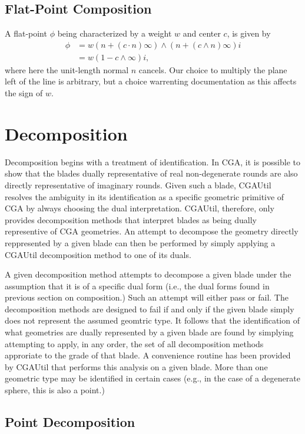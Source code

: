 \documentclass[12pt]{article}
\newcommand{\nvai}{\infty}
\begin{document}
\subsection{Flat-Point Composition}

A flat-point $\phi$ being characterized by a weight $w$ and center $c$, is given
by
\begin{align}\label{equ_flatpoint}
\phi &= w(n+(c\cdot n)\nvai)\wedge(n+(c\wedge n)\nvai)i \\
 &= w(1-c\wedge\nvai)i,
\end{align}
where here the unit-length normal $n$ cancels.  Our choice to multiply the plane
left of the line is arbitrary, but a choice warrenting documentation as this affects the sign of $w$.

\section{Decomposition}

Decomposition begins with a treatment of identification.  In CGA, it is possible
to show that the blades dually representative of real non-degenerate rounds are also
directly representative of imaginary rounds.  Given such a blade, CGAUtil resolves
the ambiguity in its identification as a specific geometric primitive of CGA by always
choosing the dual interpretation.  CGAUtil, therefore, only provides decomposition methods
that interpret blades as being dually representive of CGA geometries.  An attempt
to decompose the geometry directly reppresented by a given blade can then be
performed by simply applying a CGAUtil decomposition method to one of its duals.

A given decomposition method attempts to decompose a given blade
under the assumption that
it is of a specific dual form (i.e., the dual forms found in previous section on composition.)
Such an attempt will either pass or fail.
The decomposition methods are designed to fail if and only if the given blade
simply does not represent the assumed geomtric type.  It follows that the identification of
what geometries are dually represented by a given blade are found by simplying
attempting to apply, in any order, the set of all decomposition methods approriate
to the grade of that blade.  A convenience routine has been provided by CGAUtil
that performs this analysis on a given blade.  More than one geometric type
may be identified in certain cases (e.g., in the case of a degenerate sphere, this
is also a point.)

\subsection{Point Decomposition}
\end{document}
